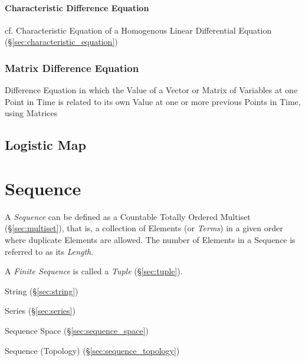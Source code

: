 \paragraph{Characteristic Difference Equation}
\label{sec:characteristic_difference_equation}\hfill

cf. Characteristic Equation of a Homogenous Linear Differential Equation
(\S\ref{sec:characteristic_equation})



\subsubsection{Matrix Difference Equation}\label{sec:matrix_difference_equation}

Difference Equation in which the Value of a Vector or Matrix of Variables at
one Point in Time is related to its own Value at one or more previous Points in
Time, using Matrices



\subsection{Logistic Map}\label{sec:logistic_map}



\section{Sequence}\label{sec:sequence}

A \emph{Sequence} can be defined as a Countable Totally Ordered
Multiset (\S\ref{sec:multiset}), that is, a collection of Elements (or
\emph{Terms}) in a given order where duplicate Elements are allowed.
The number of Elements in a Sequence is referred to as its
\emph{Length}.

A \emph{Finite Sequence} is called a \emph{Tuple} (\S\ref{sec:tuple}).

String (\S\ref{sec:string})

Series (\S\ref{sec:series})

Sequence Space (\S\ref{sec:sequence_space})

Sequence (Topology) (\S\ref{sec:sequence_topology})

